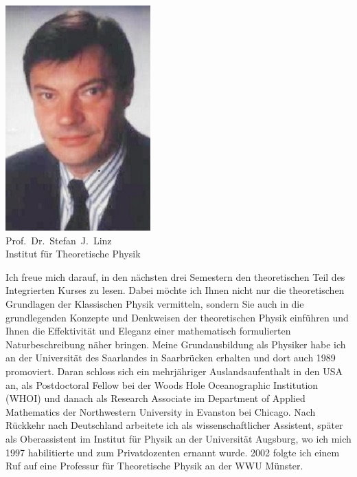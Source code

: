 \newpage

\begin{multicols}{2}
\begin{center}
\includegraphics[width=0.71\columnwidth]{res/vorstellungsfotos/linz.jpg}\\
Prof.\ Dr.\ Stefan\ J.\ Linz\\
Institut für Theoretische Physik
\end{center}

Ich freue mich darauf, in den nächsten drei Semestern den theoretischen Teil des Integrierten Kurses zu lesen. Dabei möchte ich Ihnen nicht nur die theoretischen Grundlagen der Klassischen Physik vermitteln, sondern Sie auch in die grundlegenden Konzepte und Denkweisen der
theoretischen Physik einführen und Ihnen die Effektivität und Eleganz einer mathematisch formulierten Naturbeschreibung näher bringen. Meine Grundausbildung als Physiker habe ich an der Universität des Saarlandes in Saarbrücken erhalten und dort auch 1989 promoviert. Daran schloss sich ein mehrjähriger Auslandsaufenthalt in den USA an, als Postdoctoral Fellow bei der Woods Hole Oceanographic Institution (WHOI) und danach als Research Associate im Department of Applied Mathematics der Northwestern University in Evanston bei Chicago. Nach Rückkehr nach Deutschland arbeitete ich als wissenschaftlicher Assistent, später als Oberassistent im Institut für Physik an der Universität Augsburg, wo ich mich 1997 habilitierte und zum Privatdozenten ernannt wurde. 2002 folgte ich einem Ruf auf eine Professur für Theoretische Physik an der WWU Münster.


\end{multicols}
